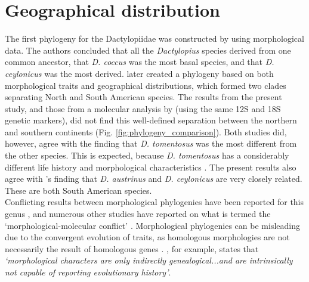 
\section{Geographical distribution}
The first phylogeny for the Dactylopiidae was constructed by \citet{Perez-Guerra1992} using morphological data. The authors concluded that all the \textit{Dactylopius} species derived from one common ancestor, that \textit{D. coccus} was the most basal species, and that \textit{D. ceylonicus} was the most derived. \citet{Rodriguez2001} later created a phylogeny based on both morphological traits and geographical distributions, which formed two clades separating North and South American species. The results from the present study, and those from a molecular analysis by \citet{Ramirez-Puebla2010MolecularBacteria} (using the same 12S and 18S genetic markers), did not find this well-defined separation between the northern and southern continents (Fig. \ref{fig:phylogeny_comparison}). 
Both studies did, however, agree with the finding that \textit{D. tomentosus} was the most different from the other species. This is expected, because \textit{D. tomentosus} has a considerably different life history and morphological characteristics \citep{Perez-Guerra1992, Mathenge2009}.
The present results also agree with \citet{Rodriguez2001}'s finding that \textit{D. austrinus} and \textit{D. ceylonicus} are very closely related. These are both South American species. \\
Conflicting results between morphological phylogenies have been reported for this genus \citep{Portillo2006AENEMIES}, and  numerous other studies have reported on what is termed the `morphological-molecular conflict' \citep{cohen2018match}. Morphological phylogenies can be misleading due to the convergent evolution of traits, as homologous morphologies are not necessarily the result of homologous genes \citep{cartmill1994critique}. \citet{cohen2018match}, for example, states that \textit{ `morphological characters are only indirectly genealogical...and are intrinsically not capable of reporting evolutionary history'}. \\
